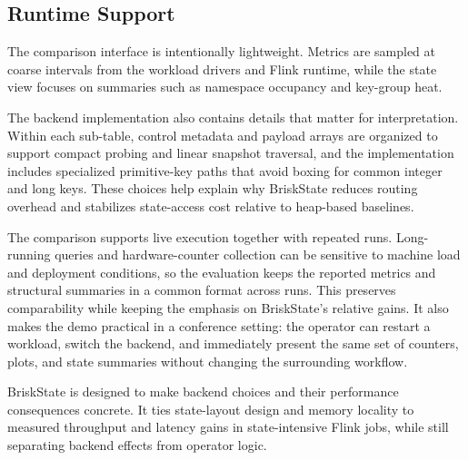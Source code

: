 \documentclass[sigconf,nonacm]{acmart}
\newcommand{\briskstate}{BriskState\xspace}
\begin{document}
\subsection{Runtime Support}
The comparison interface is intentionally lightweight. Metrics are sampled at coarse intervals from the workload drivers and Flink runtime, while the state view focuses on summaries such as namespace occupancy and key-group heat.

The backend implementation also contains details that matter for interpretation. Within each sub-table, control metadata and payload arrays are organized to support compact probing and linear snapshot traversal, and the implementation includes specialized primitive-key paths that avoid boxing for common integer and long keys. These choices help explain why BriskState reduces routing overhead and stabilizes state-access cost relative to heap-based baselines.

The comparison supports live execution together with repeated runs. Long-running queries and hardware-counter collection can be sensitive to machine load and deployment conditions, so the evaluation keeps the reported metrics and structural summaries in a common format across runs. This preserves comparability while keeping the emphasis on BriskState's relative gains. It also makes the demo practical in a conference setting: the operator can restart a workload, switch the backend, and immediately present the same set of counters, plots, and state summaries without changing the surrounding workflow.

\briskstate is designed to make backend choices and their performance consequences concrete. It ties state-layout design and memory locality to measured throughput and latency gains in state-intensive Flink jobs, while still separating backend effects from operator logic.
\end{document}
